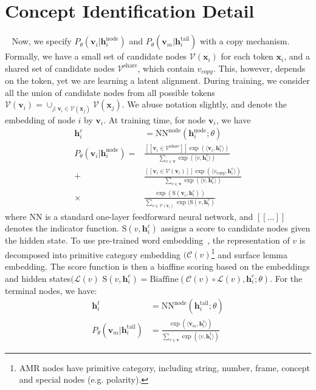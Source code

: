 \documentclass[11pt]{article}
\begin{document}
\section{Concept Identification Detail}~\label{append:concept}
Now, we specify $P_\theta(\mathbf{v}_i|\mathbf{h}^{\mathrm{node}}_i) $ and $P_\theta(\mathbf{v}_m|\mathbf{h}^{\mathrm{tail}}_i)$ with a copy mechanism. Formally, we have a small set of candidate nodes $\mathcal{V}(\mathbf{x}_i)$  for each token $\mathbf{x}_i$, and a shared set of candidate nodes $\mathcal{V}^{\mathrm{share}}$, which contain $v_{copy}$. This, however, depends on the token, yet we are learning a latent alignment. During training, we consider all the union of candidate nodes from all possible tokens$ \mathcal{V}(\mathbf{v}_i) = \cup_{j: \mathbf{v}_i \in \mathcal{V}(\mathbf{x}_j)}    \mathcal{V}(\mathbf{x}_j)  $. We abuse notation slightly, and denote the embedding of node $i$ by $\mathbf{v}_i$. At training time, for node $\mathbf{v}_i$, we have \begin{align}
\mathbf{h}^c_i &= \mathrm{NN}^{\mathrm{node}}(\mathbf{h}^{\mathrm{node}}_i;\theta) \\
P_\theta(\mathbf{v}_i|\mathbf{h}^{\mathrm{node}}_i) 
=& \frac{ [[\mathbf{v}_i \in \mathcal{V}^{\mathrm{share}} ]]  \exp (\langle \mathbf{v}_i,\mathbf{h}^c_i \rangle) }{\sum_{v \in \mathbb{\mathbf{v}} } \exp (\langle v,\mathbf{h}^c_i\rangle)}  \nonumber\\
+&   \frac{ [[\mathbf{v}_i \in \mathcal{V}(\mathbf{v}_i)]]  \exp (\langle v_{copy},\mathbf{h}^c_i \rangle) }{\sum_{v \in \mathbb{\mathbf{v}} } \exp (\langle v,\mathbf{h}^c_i\rangle)} \nonumber \\
\times &   \frac{  \exp (\mathrm{S}(\mathbf{v}_i,\mathbf{h}^c_i )) }{\sum_{v \in  \mathcal{V}(\mathbf{v}_i)  } \exp (\mathrm{S}(v,\mathbf{h}^c_i )} 
\end{align}
where $\mathrm{NN}$ is a standard one-layer feedforward neural network, and $[[\ldots]]$ denotes the indicator function. $\mathrm{S}(v,\mathbf{h}^c_i )$ assigns a score to candidate nodes given the hidden state. To use pre-trained word embedding~\cite{pennington2014glove}, the representation of $v$ is decomposed into primitive category embedding $(\mathcal{C}(v)$\footnote{AMR nodes have primitive category, including string, number, frame, concept and special nodes (e.g. polarity).} and surface lemma embedding. The score function is then a biaffine scoring based on the embeddings and hidden states$(\mathcal{L}(v)$ $\mathrm{S}(v,\mathbf{h}^c_i )=\mathrm{Biaffine}(\mathcal{C}(v)\circ \mathcal{L}(v),\mathbf{h}^c_i;\theta)$. For the terminal nodes, we have:
\begin{align}
\mathbf{h}^t_i &= \mathrm{NN}^{\mathrm{node}}(\mathbf{h}^{\mathrm{tail}}_i;\theta)  \\
   P_\theta(\mathbf{v}_m|\mathbf{h}^{\mathrm{tail}}_i) &= \frac{ \exp (\langle \mathbf{v}_m,\mathbf{h}^t_i \rangle) }{\sum_{v \in \mathbb{\mathbf{v}} } \exp (\langle v,\mathbf{h}^t_i\rangle)} 
\end{align}
\end{document}
